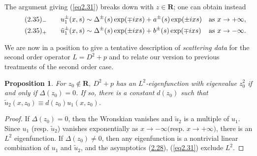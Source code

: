 \documentclass{surv-l}
\theoremstyle{plain}
\newtheorem{prop}[theorem]{Proposition}
\theoremstyle{definition}
\numberwithin{equation}{chapter}
\begin{document}
The argument giving (\ref{eq2.31}) breaks down with $z\in \mathbf{R}$; one can obtain instead
\begin{align*}\label{eq2.35-}
\tag*{$(2.35)_{-}$} \qquad  &u_{1}^{\pm}(x,s)\sim\Delta^{\pm}(s)\exp(\mp ixs)+a^{\pm}(s)\exp(\pm ixs) &\mathrm{as}\ x\rightarrow+\infty, \\\label{eq2.35+}
\tag*{$(2.35)_{+}$} \qquad  &\tilde{u}_{1}^{\pm}(x,s)\sim\Delta^{\pm}(s)\exp(\pm ixs)+b^{\pm}(s)\exp(\mp ixs) &\mathrm{as}\ x\rightarrow-\infty.
\end{align*}

We are now in a position to give a tentative description of \emph{scattering data} for the second order operator $L=D^{2}+p$ and to relate our version to previous treatments of the second order case.
\setcounter{theorem}{35}
\begin{prop}\label{chap01:prop2.36}For $z_{0}\not\in \mathbf{R},\ D^{2}+p$  has an $L^{2}$-eigenfunction with
eigenvalue $z_{0}^{2}$ if and only if $\Delta(z_{0})=0$. If so, there is a constant $d(z_{0})$ such that $\tilde{u}_{2}(x, z_{0})\equiv d(z_{0})u_{1}(x, z_{0})$.
\end{prop}

\begin{proof}
 If $\Delta (z_{0})=0$, then the Wronskian vanishes and $\tilde{u}_{2}$ is a multiple of $u_{1}$. Since $u_{1}$ (resp. $\tilde{u}_{2}$) vanishes exponentially as $x\rightarrow-\infty ($resp. $x\rightarrow+\infty)$, there is an $L^{2}$ eigenfunction. If $\Delta(z_{0})\neq 0$, then any eigenfunction is a nontrivial linear combination of $u_{1}$ and $\tilde{u}_{2}$, and the asymptotics (\hyperref[eq2.28-]{2.28}), (\ref{eq2.31}) exclude $L^{2}$.
 \end{proof}
\end{document}
